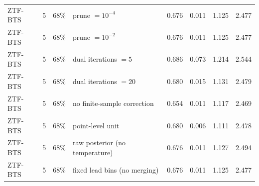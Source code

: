 \begin{longtable}{lllp{4.2cm}cccc}
ZTF-BTS & 5 & 68\% & prune $= 10^{-4}$ & 0.676 & 0.011 & 1.125 & 2.477 \\
ZTF-BTS & 5 & 68\% & prune $= 10^{-2}$ & 0.676 & 0.011 & 1.125 & 2.477 \\
ZTF-BTS & 5 & 68\% & dual iterations $= 5$ & 0.686 & 0.073 & 1.214 & 2.544 \\
ZTF-BTS & 5 & 68\% & dual iterations $= 20$ & 0.680 & 0.015 & 1.131 & 2.479 \\
ZTF-BTS & 5 & 68\% & no finite-sample correction & 0.654 & 0.011 & 1.117 & 2.469 \\
ZTF-BTS & 5 & 68\% & point-level unit & 0.680 & 0.006 & 1.111 & 2.478 \\
ZTF-BTS & 5 & 68\% & raw posterior (no temperature) & 0.676 & 0.011 & 1.127 & 2.494 \\
ZTF-BTS & 5 & 68\% & fixed lead bins (no merging) & 0.676 & 0.011 & 1.125 & 2.477 \\
\bottomrule
\end{longtable}
\par\endgroup
